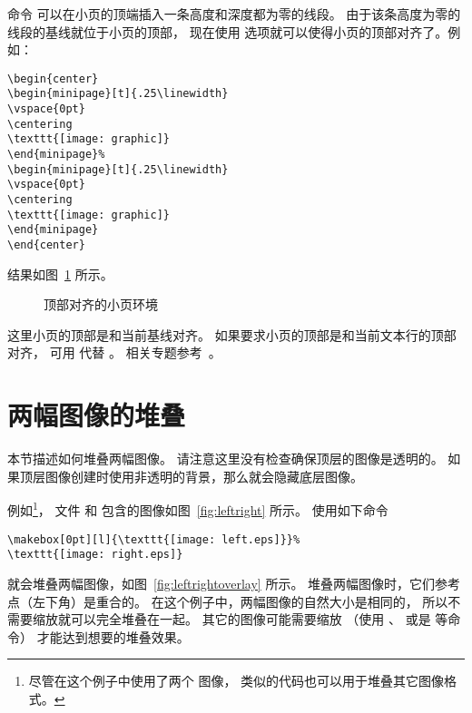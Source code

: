 命令  可以在小页的顶端插入一条高度和深度都为零的线段。
由于该条高度为零的线段的基线就位于小页的顶部，
现在使用 \opt{[t]} 选项就可以使得小页的顶部对齐了。例如：
\begin{lstlisting}
\begin{center}
\begin{minipage}[t]{.25\linewidth}
\vspace{0pt}
\centering
\texttt{[image: graphic]}
\end{minipage}%
\begin{minipage}[t]{.25\linewidth}
\vspace{0pt}
\centering
\texttt{[image: graphic]}
\end{minipage}
\end{center}
\end{lstlisting}
结果如图~\ref{fig:minipagesamp-3} 所示。
\begin{figure}
\begin{center}
	\begin{minipage}[t]{.25\linewidth}
		\vspace{0pt}
		\centering
		\resizebox{1in}{!}{\usebox{\boxgraphic}}
	\end{minipage}%
	\begin{minipage}[t]{.25\linewidth}
		\vspace{0pt}
		\centering
	\end{minipage}
\end{center}
\caption{顶部对齐的小页环境}\label{fig:minipagesamp-3}
\end{figure}

这里小页的顶部是和当前基线对齐。
如果要求小页的顶部是和当前文本行的顶部对齐，
可用  代替 。
相关专题参考~\cite[第 863--865 页]{Mittelbach2004}。


\section{两幅图像的堆叠}
本节描述如何堆叠两幅图像。
请注意这里没有检查确保顶层的图像是透明的。
如果顶层图像创建时使用非透明的背景，那么就会隐藏底层图像。

例如\footnote{
	尽管在这个例子中使用了两个  图像，
	类似的代码也可以用于堆叠其它图像格式。
}，
文件  和  包含的图像如图~\ref{fig:leftright} 所示。
使用如下命令
\begin{lstlisting}
\makebox[0pt][l]{\texttt{[image: left.eps]}}%
\texttt{[image: right.eps]}
\end{lstlisting}
就会堆叠两幅图像，如图~\ref{fig:leftrightoverlay} 所示。
堆叠两幅图像时，它们参考点（左下角）是重合的。
在这个例子中，两幅图像的自然大小是相同的，
所以不需要缩放就可以完全堆叠在一起。
其它的图像可能需要缩放
（使用 、 或是  等命令）
才能达到想要的堆叠效果。

